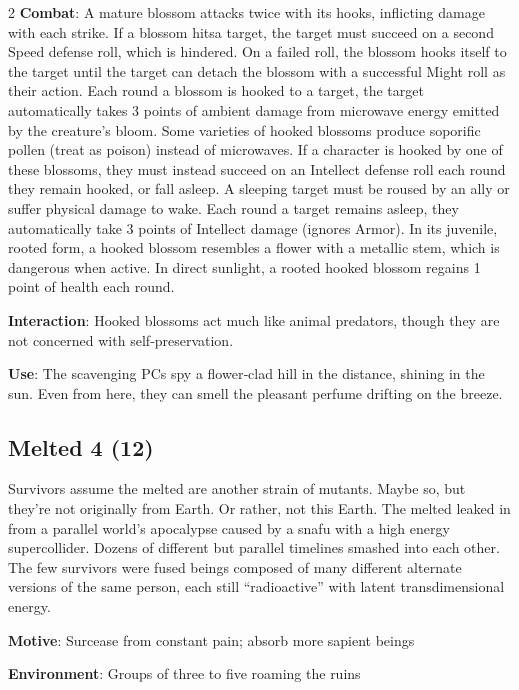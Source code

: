 \begin{multicols}{2}
\textbf{Combat}: A mature blossom attacks twice with its hooks, inflicting damage with each strike. If a blossom hitsa target, the target must succeed on a second Speed defense roll, which is hindered. On a failed roll, the blossom hooks itself to the target until the target can detach the blossom with a successful Might roll as their action. Each round a blossom is hooked to a target, the target automatically takes 3 points of ambient damage from microwave energy emitted by the creature’s bloom. Some varieties of hooked blossoms produce soporific pollen (treat as poison) instead of microwaves. If a character is hooked by one of these blossoms, they must instead succeed on an Intellect defense roll each round they remain hooked, or fall asleep. A sleeping target must be roused by an ally or suffer physical damage to wake. Each round a target remains asleep, they automatically take 3 points of Intellect damage (ignores Armor). In its juvenile, rooted form, a hooked blossom resembles a flower with a metallic stem, which is dangerous when active. In direct sunlight, a rooted hooked blossom regains 1 point of health each round.

\textbf{Interaction}: Hooked blossoms act much like animal predators, though they are not concerned with self‑preservation.

\textbf{Use}: The scavenging PCs spy a flower‑clad hill in the distance, shining in the sun. Even from here, they can smell the pleasant perfume drifting on the breeze.

\subsection{Melted 4 (12)}

Survivors assume the melted are another strain of mutants. Maybe so, but they’re not originally from Earth. Or rather, not this Earth. The melted leaked in from a parallel world’s apocalypse caused by a snafu with a high energy supercollider. Dozens of different but parallel timelines smashed into each other. The few survivors were fused beings composed of many different alternate versions of the same person, each still “radioactive” with latent transdimensional energy.
 
\textbf{Motive}: Surcease from constant pain; absorb more sapient beings 

\textbf{Environment}: Groups of three to five roaming the ruins 


\end{multicols}
